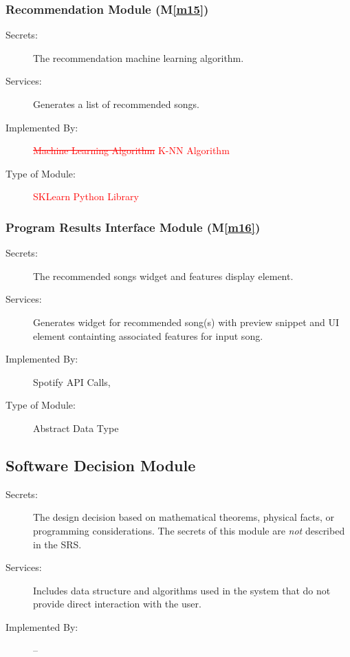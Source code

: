 \documentclass[12pt, titlepage]{article}
\newcommand{\mref}[1]{M\ref{#1}}
\begin{document}
\subsubsection{Recommendation Module (\mref{m15})}

\begin{description}
\item[Secrets:] The recommendation machine learning algorithm. 
\item[Services:] Generates a list of recommended songs. 
\item[Implemented By:] \textcolor{red}{\sout{Machine Learning Algorithm}} \textcolor{red}{K-NN Algorithm}
\item[Type of Module:] \textcolor{red}{SKLearn Python Library}
\end{description}

\subsubsection{Program Results Interface Module (\mref{m16})}

\begin{description}
\item[Secrets:] The recommended songs widget and features display element. 
\item[Services:] Generates widget for recommended song(s) with preview snippet and UI element containting associated features for input song. 
\item[Implemented By:] Spotify API Calls, 
\item[Type of Module:] Abstract Data Type
\end{description}

\subsection{Software Decision Module}

\begin{description}
\item[Secrets:] The design decision based on mathematical theorems, physical
  facts, or programming considerations. The secrets of this module are
  \emph{not} described in the SRS.
\item[Services:] Includes data structure and algorithms used in the system that
  do not provide direct interaction with the user. 
\item[Implemented By:] --
\end{description}
\end{document}
